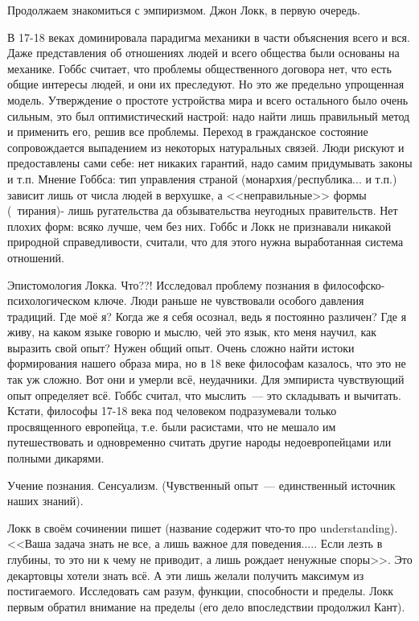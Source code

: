 Продолжаем знакомиться с эмпиризмом.
Джон Локк, в первую очередь.

В 17-18 веках доминировала парадигма механики в части объяснения всего и вся. Даже представления об отношениях людей и всего общества были основаны на механике. Гоббс считает, что проблемы общественного договора нет, что есть общие интересы людей, и они их преследуют. Но это же предельно упрощенная модель. Утверждение о простоте устройства мира и всего остального было очень сильным, это был оптимистический настрой: надо найти лишь правильный метод и применить его, решив все проблемы.
Переход в гражданское состояние сопровождается выпадением из некоторых натуральных связей. Люди рискуют и предоставлены сами себе: нет никаких гарантий, надо самим придумывать законы и т.п.
Мнение Гоббса: тип управления страной (монархия/республика... и т.п.) зависит лишь от числа людей в верхушке, а <<неправильные>> формы (~тирания)- лишь ругательства да обзывательства неугодных правительств. Нет плохих форм: всяко лучше, чем без них.
Гоббс и Локк не признавали никакой природной справедливости, считали, что для этого нужна выработанная система отношений.

Эпистомология Локка. Что??!
Исследовал проблему познания в философско-психологическом ключе. Люди раньше не чувствовали особого давления традиций. Где моё я? Когда же я себя осознал, ведь я постоянно различен? Где я живу, на каком языке говорю и мыслю, чей это язык, кто меня научил, как выразить свой опыт? Нужен общий опыт. Очень сложно найти истоки формирования нашего образа мира, но в 18 веке философам казалось, что это не так уж сложно. Вот они и умерли всё, неудачники. Для эмпириста чувствующий опыт определяет всё. Гоббс считал, что мыслить~--- это складывать и вычитать. Кстати, философы 17-18 века под человеком подразумевали только просвященного европейца, т.е. были расистами, что не мешало им путешествовать и одновременно считать другие народы недоевропейцами или полными дикарями.

Учение познания. Сенсуализм. (Чувственный опыт~--- единственный источник наших знаний).

Локк в своём сочинении пишет (название содержит что-то про understanding). <<Ваша задача знать не все, а лишь важное для поведения..... Если лезть в глубины, то это ни к чему не приводит, а лишь рождает ненужные споры>>. Это декартовцы хотели знать всё. А эти лишь желали получить максимум из постигаемого. Исследовать сам разум, функции, способности и пределы. Локк первым обратил внимание на пределы (его дело впоследствии продолжил Кант).

